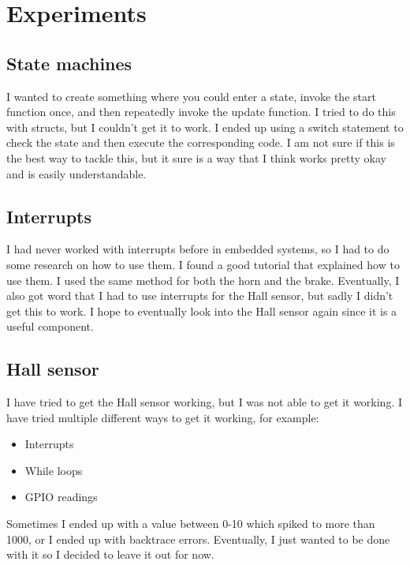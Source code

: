 \graphicspath{ {./images/} }

\section{Experiments}
\label{sec:experiments}

\subsection{State machines}
I wanted to create something where you could enter a state, invoke the start function once, and then repeatedly invoke the update function. I tried to do this with structs, but I couldn't get it to work. I ended up using a switch statement to check the state and then execute the corresponding code. I am not sure if this is the best way to tackle this, but it sure is a way that I think works pretty okay and is easily understandable.

\subsection{Interrupts}
I had never worked with interrupts before in embedded systems, so I had to do some research on how to use them. I found a good tutorial that explained how to use them. I used the same method for both the horn and the brake. Eventually, I also got word that I had to use interrupts for the Hall sensor, but sadly I didn't get this to work. I hope to eventually look into the Hall sensor again since it is a useful component.

\subsection{Hall sensor}
I have tried to get the Hall sensor working, but I was not able to get it working. I have tried multiple different ways to get it working, for example:
\begin{itemize}
    \item Interrupts
    \item While loops
    \item GPIO readings
\end{itemize}
Sometimes I ended up with a value between 0-10 which spiked to more than 1000, or I ended up with backtrace errors. Eventually, I just wanted to be done with it so I decided to leave it out for now.

